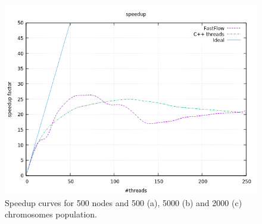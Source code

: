 \documentclass[a4paper,10pt]{article}
\begin{document}
\begin{figure}[H]
\begin{minipage}[t]{0.32\linewidth}
				\subcaption{}
			\end{minipage}
				\begin{minipage}[t]{0.32\linewidth}
				\includegraphics[width=\linewidth]{BenchMarkTSP/speedup/500/SU50020000_zoom.png}
				\subcaption{}
			\end{minipage}
				\caption{Speedup curves for 500 nodes and 500 (a), 5000 (b) and 2000 (c) chromosomes population.}
				\label{500}
			\end{figure}
\end{document}
